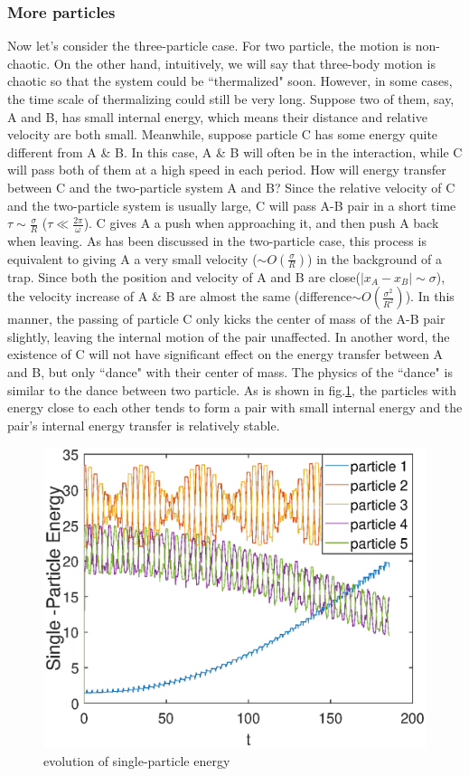 \documentclass[aps,pre,twocolumn,groupedaddress]{revtex4-1}
\begin{document}
\subsubsection{More particles}
Now let's consider the three-particle case. For two particle, the motion is non-chaotic. On the other hand, intuitively, we will say that three-body motion is chaotic so that the system could be ``thermalized" soon. However, in some cases, the time scale of thermalizing could still be very long. Suppose two of them, say, A and B, has small internal energy, which means their distance and relative velocity are both small. Meanwhile, suppose particle C has some energy quite different from A \& B. In this case, A \& B will often be in the interaction, while C will pass both of them at a high speed in each period. How will energy transfer between C and the two-particle system A and B? Since the relative velocity of C and the two-particle system is usually large, C will pass A-B pair in a short time $\tau\sim\frac{\sigma}{R}$ ($\tau\ll\frac{2\pi}{\omega}$). C gives A a push when approaching it, and then push A back when leaving.  As has been discussed in the two-particle case, this process is equivalent to giving A a very small velocity ($\sim O(\frac{\sigma}{R})$) in the background of a trap. Since both the position and velocity of A and B are close($|x_A-x_B|\sim\sigma$), the velocity increase of A \& B are almost the same (difference$\sim O(\frac{\sigma^2}{R^2})$). In this manner, the passing of particle C only kicks the center of mass of the A-B pair slightly, leaving the internal motion of the pair unaffected. In another word, the existence of C will not have significant effect on the energy transfer between A and B, but only ``dance" with their center of mass. The physics of the ``dance" is similar to the dance between two particle. As is shown in fig.\ref{fig:thermalization4}, the particles with energy close to each other tends to form a pair with small internal energy and the pair's internal energy transfer is relatively stable.

\begin{figure}
\centering
\includegraphics[scale=0.5]{ZhiyuPictures/pair1_pre.eps}
\caption{evolution of single-particle energy}
\label{fig:thermalization4}
\end{figure}
\end{document}
